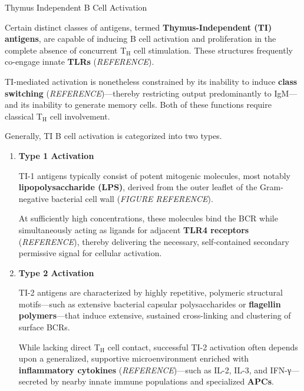       \begin{core}{Thymus Independent B Cell Activation}

        Certain distinct classes of antigens, termed \textbf{Thymus-Independent (TI) antigens}, are capable of inducing B cell activation and proliferation in the complete absence of concurrent T$_\text{H}$ cell stimulation. These structures frequently co-engage innate \textbf{TLRs} (\textit{REFERENCE}). 

        TI-mediated activation is nonetheless constrained by its inability to induce \textbf{class switching} (\textit{REFERENCE})---thereby restricting output predominantly to IgM---and its inability to generate memory cells. Both of these functions require classical T$_\text{H}$ cell involvement.

        Generally, TI B cell activation is categorized into two types.


        \begin{enumerate}

          \item \textbf{Type 1 Activation} 

            TI-1 antigens typically consist of potent mitogenic molecules, most notably \textbf{lipopolysaccharide (LPS)}, derived from the outer leaflet of the Gram-negative bacterial cell wall (\textit{FIGURE REFERENCE}).

            At sufficiently high concentrations, these molecules bind the BCR while simultaneously acting as ligands for adjacent \textbf{TLR4 receptors} (\textit{REFERENCE}), thereby delivering the necessary, self-contained secondary permissive signal for cellular activation.

          \item \textbf{Type 2 Activation}

            TI-2 antigens are characterized by highly repetitive, polymeric structural motifs---such as extensive bacterial capsular polysaccharides or \textbf{flagellin polymers}---that induce extensive, sustained cross-linking and clustering of surface BCRs.

            While lacking direct T$_\text{H}$ cell contact, successful TI-2 activation often depends upon a generalized, supportive microenvironment enriched with \textbf{inflammatory cytokines} (\textit{REFERENCE})---such as IL-2, IL-3, and IFN-γ---secreted by nearby innate immune populations and specialized \textbf{APCs}.

        \end{enumerate}

      \end{core}

